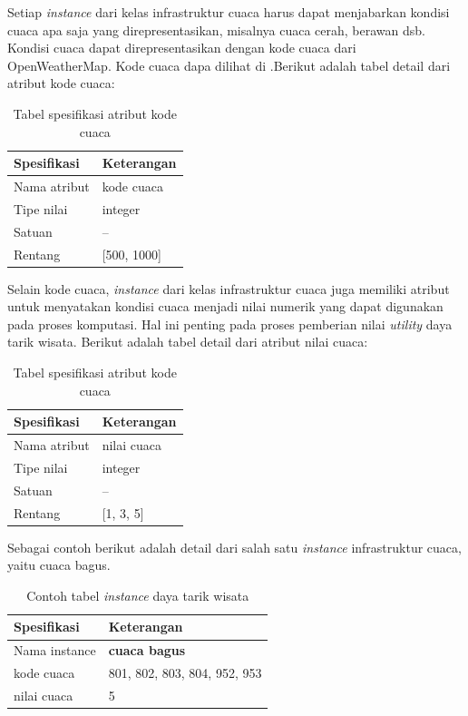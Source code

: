 Setiap \textit{instance} dari kelas infrastruktur cuaca harus dapat menjabarkan kondisi cuaca apa saja yang direpresentasikan, misalnya cuaca cerah, berawan dsb.
Kondisi cuaca dapat direpresentasikan dengan kode cuaca dari OpenWeatherMap. Kode cuaca dapa dilihat di .Berikut adalah tabel detail dari atribut kode cuaca:
\begin{table}[h]
\begin{center}
\begin{tabular}{ |l|m{8cm}| } 
\hline
	\textbf{Spesifikasi} & \textbf{Keterangan}\\
	\hline
	Nama atribut & kode cuaca\\
	\hline
	Tipe nilai & integer\\
	\hline
	Satuan & --\\
	\hline
	Rentang & [500, 1000]\\
	\hline
\end{tabular}
\end{center}
\caption{Tabel spesifikasi atribut kode cuaca}
\label{table:weatattribute}
\end{table}
\par
Selain kode cuaca, \textit{instance} dari kelas infrastruktur cuaca juga memiliki atribut untuk menyatakan kondisi cuaca menjadi nilai numerik yang dapat digunakan pada proses komputasi.
Hal ini penting pada proses pemberian nilai \textit{utility} daya tarik wisata. Berikut adalah tabel detail dari atribut nilai cuaca:
\begin{table}[h]
\begin{center}
\begin{tabular}{ |l|m{8cm}| } 
\hline
	\textbf{Spesifikasi} & \textbf{Keterangan}\\
	\hline
	Nama atribut & nilai cuaca\\
	\hline
	Tipe nilai & integer\\
	\hline
	Satuan & --\\
	\hline
	Rentang & [1, 3, 5]\\
	\hline
\end{tabular}
\end{center}
\caption{Tabel spesifikasi atribut kode cuaca}
\label{table:weatvalattribute}
\end{table}
\par
Sebagai contoh berikut adalah detail dari salah satu \textit{instance} infrastruktur cuaca, yaitu cuaca bagus.
\begin{table}[h]
\begin{center}
\begin{tabular}{ |l|m{8cm}| } 
\hline
	\textbf{Spesifikasi} & \textbf{Keterangan}\\
	\hline
	Nama instance & \textbf{cuaca bagus} \\
	\hline
	kode cuaca & 801, 802, 803, 804, 952, 953\\
	\hline
	nilai cuaca & 5\\
	\hline
\end{tabular}
\end{center}
\caption{Contoh tabel \textit{instance} daya tarik wisata}
\label{table:instance}
\end{table}


